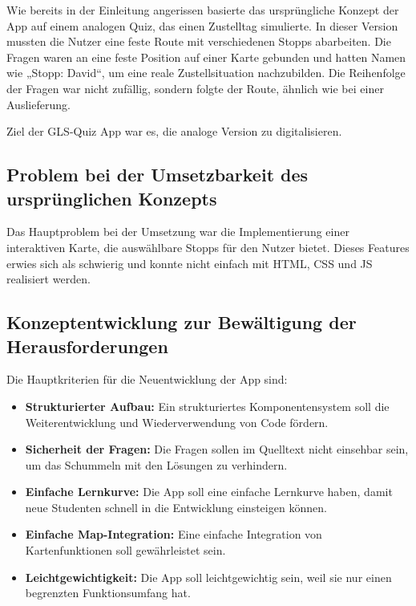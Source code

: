 \documentclass[biblatex]{lni}
\begin{document}
Wie bereits in der Einleitung angerissen basierte das ursprüngliche Konzept der App auf einem analogen Quiz,
das einen Zustelltag simulierte.
In dieser Version mussten die Nutzer eine feste Route mit verschiedenen Stopps abarbeiten.
Die Fragen waren an eine feste Position auf einer Karte gebunden und hatten Namen wie „Stopp: David“,
um eine reale Zustellsituation nachzubilden.
Die Reihenfolge der Fragen war nicht zufällig, sondern folgte der Route, ähnlich wie bei einer Auslieferung.

Ziel der GLS-Quiz App war es, die analoge Version zu digitalisieren.

\subsection{Problem bei der Umsetzbarkeit des ursprünglichen Konzepts}

Das Hauptproblem bei der Umsetzung war die Implementierung einer interaktiven Karte,
die auswählbare Stopps für den Nutzer bietet.
Dieses Features erwies sich als schwierig und konnte nicht einfach mit \ac{HTML}, \ac{CSS} und \ac{JS} realisiert werden.

\subsection{Konzeptentwicklung zur Bewältigung der Herausforderungen}

Die Hauptkriterien für die Neuentwicklung der App sind:
\begin{itemize}
  \item \textbf{Strukturierter Aufbau:} Ein strukturiertes Komponentensystem soll die Weiterentwicklung und Wiederverwendung von Code fördern.
  \item \textbf{Sicherheit der Fragen:} Die Fragen sollen im Quelltext nicht einsehbar sein, um das Schummeln mit den Lösungen zu verhindern.
  \item \textbf{Einfache Lernkurve:} Die App soll eine einfache Lernkurve haben, damit neue Studenten schnell in die Entwicklung einsteigen können.
  \item \textbf{Einfache Map-Integration:} Eine einfache Integration von Kartenfunktionen soll gewährleistet sein.
  \item \textbf{Leichtgewichtigkeit:} Die App soll leichtgewichtig sein, weil sie nur einen begrenzten Funktionsumfang hat.
\end{itemize}
\end{document}
